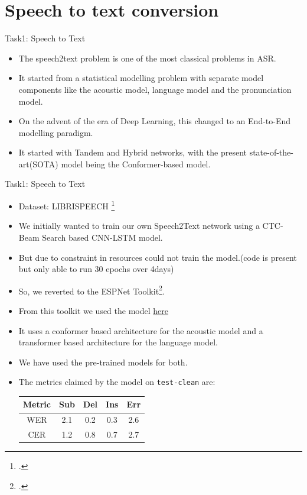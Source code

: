\documentclass[10pt]{beamer}
\begin{document}
\section{Speech to text conversion}
\begin{frame}{Task1: Speech to Text}
\begin{itemize}
	\item The speech2text problem is one of the most classical problems in ASR.
	\item It started from a statistical modelling problem with separate model components like the acoustic model, language model and the pronunciation model.
	\item On the advent of the era of Deep Learning, this changed to an End-to-End modelling paradigm.
	\item It started with Tandem and Hybrid networks, with the present state-of-the-art(SOTA) model being the Conformer-based model.
\end{itemize}
\end{frame}

\begin{frame}{Task1: Speech to Text}
\begin{itemize}
	\item Dataset: LIBRISPEECH \footcite{librispeech}
	\item We initially wanted to train our own Speech2Text network using a CTC-Beam Search based CNN-LSTM model.
	\item But due to constraint in resources could not train the model.(code is present but only able to run 30 epochs over 4days)	
	\item So, we reverted to the ESPNet Toolkit\footcite{espnet}.
	\item From this toolkit we used the model \href{https://zenodo.org/record/4604011}{here} %
	\item It uses a conformer based architecture for the acoustic model and a transformer based architecture for the language model.
	\item We have used the pre-trained models for both.
	\item The metrics claimed by the model on \texttt{test-clean} are:
	\begin{center}
	\begin{tabular}{|c|c|c|c|c|}
	\hline
	Metric & Sub & Del & Ins & Err \\
	\hline
	WER & 2.1 & 0.2 & 0.3 & 2.6 \\
	CER & 1.2 & 0.8 & 0.7 & 2.7 \\
	\hline
	\end{tabular}
	\end{center}
	
\end{itemize}
\end{frame}
\end{document}
